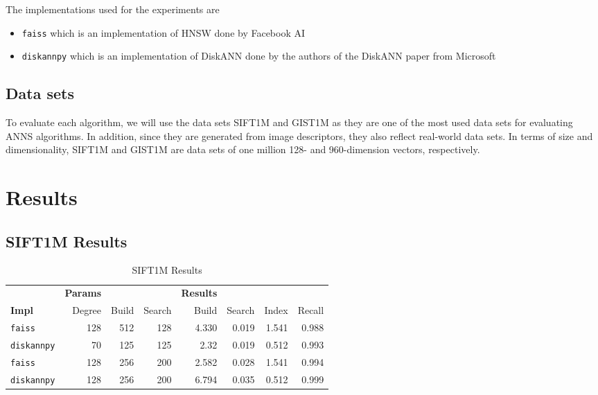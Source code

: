 The implementations used for the experiments are
\begin{itemize}
    \item \texttt{faiss} \cite{faiss-github} which is an implementation of HNSW done by Facebook AI
    \item \texttt{diskannpy} \cite{diskann-github} which is an implementation of DiskANN done by the authors of the DiskANN paper from Microsoft
\end{itemize}

\subsection{Data sets}

To evaluate each algorithm, we will use the data sets SIFT1M and GIST1M \cite{sift} as they are one of the most used data sets for evaluating ANNS algorithms. In addition, since they are generated from image descriptors, they also reflect real-world data sets. In terms of size and dimensionality, SIFT1M and GIST1M are data sets of one million 128- and 960-dimension vectors, respectively.

\section{Results}

\subsection{SIFT1M Results}

\begin{table}[ht]
    \centering
    \caption{SIFT1M Results}
    \label{tbl:sift1m-results}
    \begin{tabular}{l|rrr|rrrr}
        \toprule
        & \textbf{Params} & & & \textbf{Results} & & \\
        \textbf{Impl} & Degree & Build & Search & Build & Search & Index & Recall \\
        \midrule
        \texttt{faiss} & 128 & 512 & 128 & 4.330 & 0.019 & 1.541 & 0.988 \\
        \texttt{diskannpy} & 70 & 125 & 125 & 2.32 & 0.019 & 0.512 & 0.993 \\
        \midrule
        \texttt{faiss} & 128 & 256 & 200 & 2.582 & 0.028 & 1.541 & 0.994  \\
        \texttt{diskannpy} & 128 & 256 & 200 & 6.794 & 0.035 & 0.512 & 0.999 \\
        \bottomrule
    \end{tabular}
\end{table}


